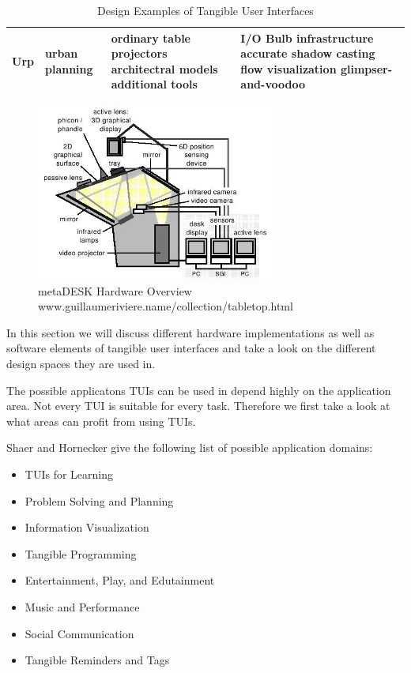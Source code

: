 \begin{center}
\begin{table}[ht]
\begin{tabular}[ct]{|p{3 cm}|p{4 cm}|p{4.5 cm}|p{4.5 cm}|}
 \hline
 Urp & urban planning & ordinary table \newline projectors \newline architectral models \newline additional tools & I/O Bulb infrastructure \newline accurate shadow casting \newline flow visualization \newline glimpser-and-voodoo \\
 \hline
\end{tabular}
\hfill{}
\caption{Design Examples of Tangible User Interfaces}
\label{tb:design}
\end{table}
\end{center}


\begin{figure}
\centering
\includegraphics[width=0.7\textwidth]{figures/metaDeskHardware.jpg}
\caption{metaDESK Hardware Overview www.guillaumeriviere.name/collection/tabletop.html}
\label{fig:metadeskhardware}
\end{figure}

In this section we will discuss different hardware implementations as well as software elements of tangible user interfaces and take a look on the different design spaces they are used in. 

The possible applicatons TUIs can be used in depend highly on the application area. Not every TUI is suitable for every task. Therefore we first take a look at what areas can profit from using TUIs. 

Shaer and Hornecker \cite{hornecker10} give the following list of possible application domains:
\begin{itemize}
\item TUIs for Learning
\item Problem Solving and Planning
\item Information Visualization
\item Tangible Programming
\item Entertainment, Play, and Edutainment
\item Music and Performance
\item Social Communication 
\item Tangible Reminders and Tags
\end{itemize}

